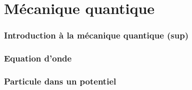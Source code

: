 \setcounter{part}{25}    %

\part{Mécanique quantique}
\section{Introduction à la mécanique quantique (sup)}

\section{Equation d'onde}


\section{Particule dans un potentiel}



% 

